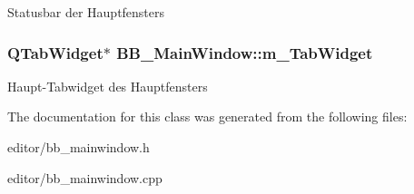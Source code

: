 Statusbar der Hauptfensters 
\subsubsection{\setlength{\rightskip}{0pt plus 5cm}QTab\-Widget$\ast$ {\bf BB\_\-Main\-Window::m\_\-Tab\-Widget}\hspace{0.3cm}{\tt  [protected]}}\label{classBB__MainWindow_p4}


Haupt-Tabwidget des Hauptfensters 

The documentation for this class was generated from the following files:\begin{CompactItemize}
\item 
editor/bb\_\-mainwindow.h\item 
editor/bb\_\-mainwindow.cpp\end{CompactItemize}
